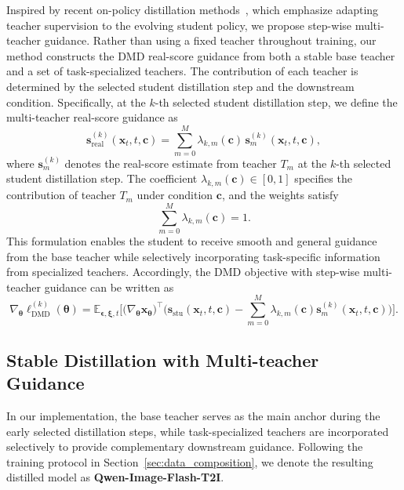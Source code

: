 \documentclass{llmxive}
\providecommand{\bm}[1]{\boldsymbol{#1}}
\begin{document}
Inspired by recent on-policy distillation methods~\citep{xiao2026mimo, li2026diffusionopd, fang2026flow}, 
which emphasize adapting teacher supervision to the evolving student policy, we propose step-wise multi-teacher guidance. Rather than using a fixed teacher throughout training, our method constructs the DMD real-score guidance from both a stable base teacher and a set of task-specialized teachers. The contribution of each teacher is determined by the selected student distillation step and the downstream condition. Specifically, at the $k$-th selected student distillation step, we define the multi-teacher real-score guidance as
\begin{equation}
\bm{s}_{\mathrm{real}}^{(k)}(\bm{x}_t,t,\bm{c})
=
\sum_{m=0}^{M}
\lambda_{k,m}(\bm{c})\,
\bm{s}_m^{(k)}(\bm{x}_t,t,\bm{c}),
\label{eq:multi_teacher_score}
\end{equation}
where $\bm{s}_m^{(k)}$ denotes the real-score estimate from teacher $T_m$ at the $k$-th selected student distillation step. 
The coefficient $\lambda_{k,m}(\bm{c}) \in [0,1]$ specifies the contribution of teacher $T_m$ under condition $\bm{c}$, and the weights satisfy
\begin{equation}
\sum_{m=0}^{M}\lambda_{k,m}(\bm{c})=1.
\label{eq:teacher_weight_sum}
\end{equation}
This formulation enables the student to receive smooth and general guidance from the base teacher while selectively incorporating task-specific information from specialized teachers. Accordingly, the DMD objective with step-wise multi-teacher guidance can be written as
\begin{equation}
\nabla_{\bm \theta} \ell_{\text{DMD}}^{(k)}(\bm\theta)
=
\mathbb{E}_{\bm{\epsilon},\bm{\xi},t}
\Big[
\Big(\nabla_{\bm{\theta}} \bm{x}_{\bm{\theta}}\Big)^\intercal
\Big(
\bm s_{\text{stu}}(\bm{x}_t,t,\bm c)
-
\sum_{m=0}^{M}
\lambda_{k,m}(\bm c)
\bm s_m^{(k)}(\bm{x}_t,t,\bm c)
\Big)
\Big].
\label{eq:modified_dmd}
\end{equation}

\subsection{Stable Distillation with Multi-teacher Guidance}

In our implementation, the base teacher serves as the main anchor during the early selected distillation steps, while task-specialized teachers are incorporated selectively to provide complementary downstream guidance. Following the training protocol in Section~\ref{sec:data_composition}, we denote the resulting distilled model as \textbf{Qwen-Image-Flash-T2I}.
\end{document}
